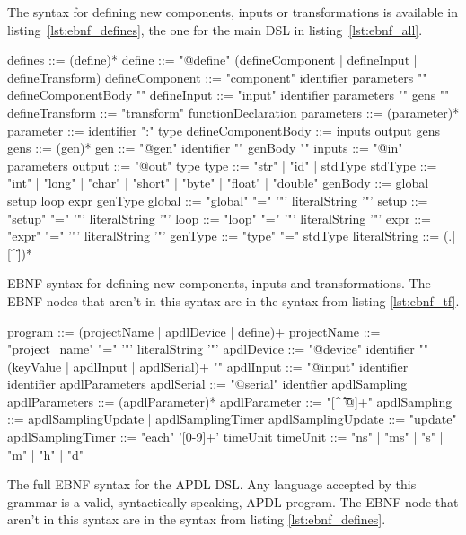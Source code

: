 The syntax for defining new components, inputs or transformations is available
in listing~\ref{lst:ebnf_defines}, the one for the main \gls{DSL} in
listing~\ref{lst:ebnf_all}.

\begin{listing}[!htbp]
  \centering
  \begin{ebnfcode}
defines ::= (define)*
define ::= "@define" (defineComponent | defineInput | defineTransform)
defineComponent ::= "component" identifier parameters "{" defineComponentBody "}"
defineInput ::= "input" identifier parameters "{" gens "}"
defineTransform ::= "transform" functionDeclaration
parameters ::= (parameter)*
parameter ::= identifier ":" type
defineComponentBody ::= inputs output gens
gens ::= (gen)*
gen ::= "@gen" identifier "{" genBody "}"
inputs ::= "@in" parameters
output ::= "@out" type
type ::= "str" | "id" | stdType
stdType ::= "int" | "long" | "char" | "short" | "byte" | "float" | "double"
genBody ::= global setup loop expr genType
global ::= "global" "=" '"' literalString '"'
setup ::= "setup" "=" '"' literalString '"'
loop ::= "loop" "=" '"' literalString '"'
expr ::= "expr" "=" '"' literalString '"'
genType ::= "type" "=" stdType
literalString ::= (.|[^\"])*
  \end{ebnfcode}
  \caption[EBNF syntax for APDL's new definition]{EBNF syntax for defining new
components, inputs and transformations. The EBNF nodes that aren't in this
syntax are in the syntax from listing \ref{lst:ebnf_tf}.}
  \label{lst:ebnf_defines}
\end{listing}

\begin{listing}[!htbp]
  \centering
  \begin{ebnfcode}
program ::= (projectName | apdlDevice | define)+
projectName ::= "project_name" "=" '"' literalString '"'
apdlDevice ::= "@device" identifier "{" (keyValue | apdlInput | apdlSerial)+ "}"
apdlInput ::= "@input" identifier identifier apdlParameters
apdlSerial ::= "@serial" identfier apdlSampling
apdlParameters ::= (apdlParameter)*
apdlParameter ::= "[^ \t\f\n\r{}@]+"
apdlSampling ::= apdlSamplingUpdate | apdlSamplingTimer
apdlSamplingUpdate ::= "update"
apdlSamplingTimer ::= "each" '[0-9]+' timeUnit
timeUnit ::= "ns" | "ms" | "s" | "m" | "h" | "d"
  \end{ebnfcode}
  \caption[EBNF syntax for the \gls{APDL} \gls{DSL}]{The full EBNF syntax for
the \gls{APDL} \gls{DSL}. Any language accepted by this grammar is a valid,
syntactically speaking, \gls{APDL} program. The EBNF node that aren't in this
syntax are in the syntax from listing \ref{lst:ebnf_defines}.}
  \label{lst:ebnf_all}
\end{listing}

